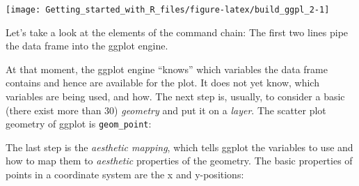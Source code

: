 \documentclass[]{svmono}
\newenvironment{Shaded}{\begin{snugshade}}{\end{snugshade}}
\newcommand{\KeywordTok}[1]{\textcolor[rgb]{0.13,0.29,0.53}{\textbf{#1}}}
\newcommand{\DataTypeTok}[1]{\textcolor[rgb]{0.13,0.29,0.53}{#1}}
\newcommand{\StringTok}[1]{\textcolor[rgb]{0.31,0.60,0.02}{#1}}
\newcommand{\OperatorTok}[1]{\textcolor[rgb]{0.81,0.36,0.00}{\textbf{#1}}}
\newcommand{\NormalTok}[1]{#1}
\begin{document}
\begin{Shaded}
\end{Shaded}

\texttt{[image: Getting\_started\_with\_R\_files/figure-latex/build\_ggpl\_2-1]}

Let's take a look at the elements of the command chain: The first two
lines pipe the data frame into the ggplot engine.

\begin{Shaded}
\end{Shaded}

At that moment, the ggplot engine ``knows'' which variables the data
frame contains and hence are available for the plot. It does not yet
know, which variables are being used, and how. The next step is,
usually, to consider a basic (there exist more than 30) \emph{geometry}
and put it on a \emph{layer}. The scatter plot geometry of ggplot is
\texttt{geom\_point}:

\begin{Shaded}
\end{Shaded}

The last step is the \emph{aesthetic mapping}, which tells ggplot the
variables to use and how to map them to \emph{aesthetic} properties of
the geometry. The basic properties of points in a coordinate system are
the x and y-positions:

\begin{Shaded}
\end{Shaded}
\end{document}
